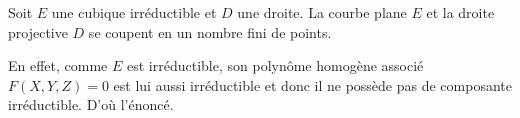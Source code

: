 \begin{corollaire}
    Soit $E$ une cubique irréductible et $D$ une droite. La courbe plane $E$ et la droite
    projective $D$ se coupent en un nombre fini de points.
\end{corollaire}

\begin{demonstration}
    En effet, comme $E$ est irréductible, son polynôme homogène associé $F(X,Y,Z) = 0$
    est lui aussi irréductible et donc il ne possède pas de composante irréductible. D'où
    l'énoncé.
\end{demonstration}









